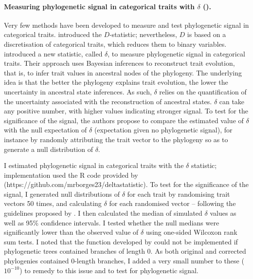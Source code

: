 \paragraph{Measuring phylogenetic signal in categorical traits with $\delta$ (\cite{Borges2018}).}
Very few methods have been developed to measure and test phylogenetic signal in categorical traits. \citet{Fritz2009} introduced the $D$-statistic; nevertheless, $D$ is based on a discretisation of categorical traits, which reduces them to binary variables. \citet{Borges2018} introduced a new statistic, called $\delta$, to measure phylogenetic signal in categorical traits. Their approach uses Bayesian inferences to reconstruct trait evolution, that is, to infer trait values in ancestral nodes of the phylogeny. The underlying idea is that the  better the phylogeny explains trait evolution, the lower the uncertainty in ancestral state inferences. As such, $\delta$ relies on the quantification of the uncertainty associated with the reconstruction of ancestral states. $\delta$ can take any positive number, with higher values indicating stronger signal. To test for the significance of the signal, the authors propose to compare the estimated value of $\delta$ with the null expectation  of $\delta$ (expectation given no phylogenetic signal), for instance by randomly attributing the trait vector to the phylogeny so as to generate a null distribution of $\delta$. 

I estimated phylogenetic signal in categorical traits with the $\delta$ statistic; implementation used the R code provided by \citet{Borges2018} (https://github.com/mrborges23/delta\textunderscore statistic). To test for the significance of the signal, I generated null distributions of $\delta$  for each trait by randomising trait vectors 50 times, and calculating $\delta$ for each randomised vector -- following the guidelines proposed by \citet{Borges2018}. I then calculated the median of simulated $\delta$ values as well as 95\% confidence intervals. I tested whether the null medians were significantly lower than the observed value of $\delta$ using one-sided Wilcoxon rank sum tests. I noted that the function developed by \citet{Borges2018} could not be implemented if phylogenetic trees contained branches of length 0. As both original and corrected phylogenies contained 0-length branches, I added a very small number to these ($10^{-10}$) to remedy to this issue and to test for phylogenetic signal. 


